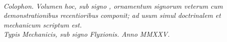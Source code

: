 \documentclass[12pt]{article}
\newcommand{\dingir}{\centerline{\Large \cunei{𒀭}}}
\newcommand{\divider}{\vspace{1em}\dingir\vspace{1em}}
\begin{document}
\divider

\begin{center}
\dingir\\[0.5em]
\textit{Colophon.} \;
\textit{Volumen hoc, sub signo , ornamentum signorum veterum cum demonstrationibus recentioribus componit; ad usum simul doctrinalem et mechanicum scriptum est.}\\[0.25em]
\textit{Typis Mechanicis, sub signo Flyxionis. \; Anno MMXXV.}
\end{center}
\end{document}
